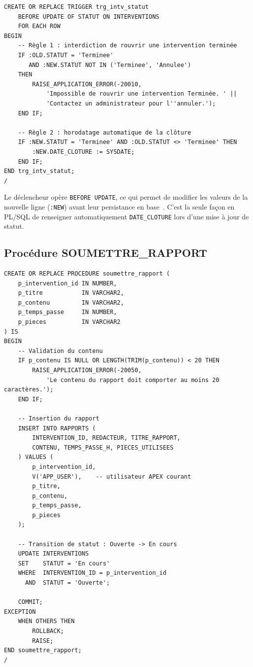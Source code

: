 \documentclass[12pt,a4paper,oneside]{report}
\begin{document}
\begin{lstlisting}[language=PLSQL, caption=Déclencheur de contrôle des transitions de statut]
CREATE OR REPLACE TRIGGER trg_intv_statut
    BEFORE UPDATE OF STATUT ON INTERVENTIONS
    FOR EACH ROW
BEGIN
    -- Règle 1 : interdiction de rouvrir une intervention terminée
    IF :OLD.STATUT = 'Terminee'
       AND :NEW.STATUT NOT IN ('Terminee', 'Annulee')
    THEN
        RAISE_APPLICATION_ERROR(-20010,
            'Impossible de rouvrir une intervention Terminée. ' ||
            'Contactez un administrateur pour l''annuler.');
    END IF;

    -- Règle 2 : horodatage automatique de la clôture
    IF :NEW.STATUT = 'Terminee' AND :OLD.STATUT <> 'Terminee' THEN
        :NEW.DATE_CLOTURE := SYSDATE;
    END IF;
END trg_intv_statut;
/
\end{lstlisting}

\begin{remarque}
Le déclencheur opère \texttt{BEFORE UPDATE}, ce qui permet de modifier les valeurs de la nouvelle ligne (\texttt{:NEW}) avant leur persistance en base~\cite{oracle_plsql}. C'est la seule façon en PL/SQL de renseigner automatiquement \texttt{DATE\_CLOTURE} lors d'une mise à jour de statut.
\end{remarque}

\subsection{Procédure SOUMETTRE\_RAPPORT}

\begin{lstlisting}[language=PLSQL, caption=Procédure stockée de soumission de rapport]
CREATE OR REPLACE PROCEDURE soumettre_rapport (
    p_intervention_id IN NUMBER,
    p_titre           IN VARCHAR2,
    p_contenu         IN VARCHAR2,
    p_temps_passe     IN NUMBER,
    p_pieces          IN VARCHAR2
) IS
BEGIN
    -- Validation du contenu
    IF p_contenu IS NULL OR LENGTH(TRIM(p_contenu)) < 20 THEN
        RAISE_APPLICATION_ERROR(-20050,
            'Le contenu du rapport doit comporter au moins 20 caractères.');
    END IF;

    -- Insertion du rapport
    INSERT INTO RAPPORTS (
        INTERVENTION_ID, REDACTEUR, TITRE_RAPPORT,
        CONTENU, TEMPS_PASSE_H, PIECES_UTILISEES
    ) VALUES (
        p_intervention_id,
        V('APP_USER'),    -- utilisateur APEX courant
        p_titre,
        p_contenu,
        p_temps_passe,
        p_pieces
    );

    -- Transition de statut : Ouverte -> En cours
    UPDATE INTERVENTIONS
    SET    STATUT = 'En cours'
    WHERE  INTERVENTION_ID = p_intervention_id
      AND  STATUT = 'Ouverte';

    COMMIT;
EXCEPTION
    WHEN OTHERS THEN
        ROLLBACK;
        RAISE;
END soumettre_rapport;
/
\end{lstlisting}
\end{document}
